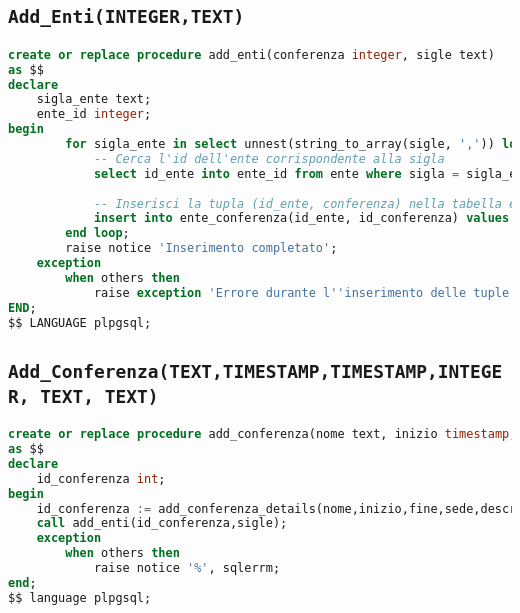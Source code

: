 \subsection{\texttt{Add\_Enti(INTEGER,TEXT)}}
\begin{lstlisting}[language=SQL,style=mystyle]
create or replace procedure add_enti(conferenza integer, sigle text)
as $$
declare
    sigla_ente text;
    ente_id integer;
begin
        for sigla_ente in select unnest(string_to_array(sigle, ',')) loop
            -- Cerca l'id dell'ente corrispondente alla sigla
            select id_ente into ente_id from ente where sigla = sigla_ente;
            
            -- Inserisci la tupla (id_ente, conferenza) nella tabella ente_conferenza
            insert into ente_conferenza(id_ente, id_conferenza) values (ente_id, conferenza);
        end loop;
        raise notice 'Inserimento completato';
    exception
        when others then
            raise exception 'Errore durante l''inserimento delle tuple nella tabella ente_conferenza: %', sqlerrm;
END;
$$ LANGUAGE plpgsql;
\end{lstlisting}
\subsection{\texttt{Add\_Conferenza(TEXT,TIMESTAMP,TIMESTAMP,INTEGER, TEXT, TEXT)}}
\begin{lstlisting}[language=SQL,style=mystyle]
create or replace procedure add_conferenza(nome text, inizio timestamp, fine timestamp, sede integer, descrizione text, sigle text, utente integer)
as $$
declare
    id_conferenza int;
begin
    id_conferenza := add_conferenza_details(nome,inizio,fine,sede,descrizione,utente);
    call add_enti(id_conferenza,sigle);
    exception
        when others then
            raise notice '%', sqlerrm;
end;
$$ language plpgsql;
\end{lstlisting}
